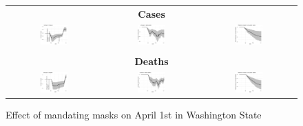 \documentclass[11pt,reqno,letter]{amsart}
\theoremstyle{definition}
\begin{document}
\begin{figure}[ht]
  \caption{Effect of mandating masks on April 1st in Washington State \label{fig:WA-mask}}
  \begin{minipage}{\linewidth}
    \centering
    \begin{tabular}{ccc}
      \multicolumn{3}{c}{\textbf{Cases}} \\
      \includegraphics[width=0.31\textwidth]{tables_and_figures/Washington-mask-dgrowth_idx}
      &
        \includegraphics[width=0.31\textwidth]{tables_and_figures/Washington-mask-dcases_idx}
      &
        \includegraphics[width=0.31\textwidth]{tables_and_figures/Washington-mask-rcumu_idx}
      \\
      \\
      \multicolumn{3}{c}{\textbf{Deaths}}
      \\
      \includegraphics[width=0.31\textwidth]{tables_and_figures/Washington-mask-dgrowth_deaths_idx}
      &
        \includegraphics[width=0.31\textwidth]{tables_and_figures/Washington-mask-dcases_deaths_idx}
      & \includegraphics[width=0.31\textwidth]{tables_and_figures/Washington-mask-rcumu_deaths_idx}
    \end{tabular}


\end{minipage}
\end{figure}
\end{document}
